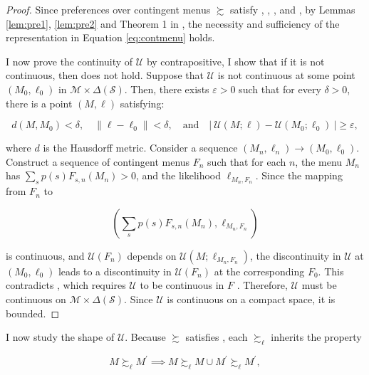 \begin{proof}
	Since preferences over contingent menus \( \succsim \) satisfy , , , and , by Lemmas \ref{lem:pre1}, \ref{lem:pre2} and Theorem 1 in \cite{liangInformationdependentExpectedUtility2017}, the necessity and sufficiency of the representation in Equation \eqref{eq:contmenu} holds.

	I now prove the continuity of \( \mathcal{U} \) by contrapositive, I show that if it is not continuous, then  does not hold. Suppose that \( \mathcal{U} \) is not continuous at some point \( (M_{0}, \ell_{0}) \) in \( \mathcal{M} \times \Delta( \mathcal{S} ) \). Then, there exists \( \varepsilon > 0 \) such that for every \( \delta > 0 \), there is a point \( (M, \ell) \) satisfying:

	\[
		d \left( M, M_{0} \right) < \delta, \quad \| \ell - \ell_{0} \| < \delta, \quad \text{and} \quad \left| \ \mathcal{U}(M; \ell) - \mathcal{U}(M_{0}; \ell_{0}) \ \right| \geq \varepsilon,
	\]

	where \( d \) is the Hausdorff metric. Consider a sequence \( (M_{n}, \ell_{n}) \rightarrow (M_{0}, \ell_{0}) \). Construct a sequence of contingent menus \( F_{n} \) such that for each \( n \), the menu \( M_{n} \) has \( \sum_{s} p \left( s \right) F_{s,n} \left( M_{n} \right) > 0 \), and the likelihood \( \ell_{M_{n}, F_{n}} \). Since the mapping from \( F_n \) to 
	
	\[ \left( \sum_{s} p \left( s \right) F_{s,n} \left( M_{n} \right) , \ell_{M_n,F_n} \right) \]
	
	is continuous, and \( \mathscr{U}(F_n) \) depends on \( \mathcal{U}(M; \ell_{M_n,F_n}) \), the discontinuity in \( \mathcal{U} \) at \( (M_{0}, \ell_{0}) \) leads to a discontinuity in \( \mathscr{U}(F_n) \) at the corresponding \( F_{0} \). This contradicts , which requires \( \mathscr{U} \) to be continuous in \( F \) \citep[ Theorem 3.5 p. 36]{fishburnUtilityTheoryDecision1970}. Therefore, \( \mathcal{U} \) must be continuous on \( \mathcal{M} \times \Delta \left( \mathcal{S} \right) \). Since \( \mathcal{U} \) is continuous on a compact space, it is bounded.
\end{proof}

I now study the shape of \( \mathcal{U} \). Because \( \succsim \) satisfies , each \( \succsim_{\ell} \) inherits the property

\begin{equation}\label{eq:sbetweenness0}
	M \succsim_{\ell} M^{\prime} \implies M \succsim_{\ell} M \cup M^{\prime} \succsim_{\ell} M^{\prime} ,
\end{equation}

